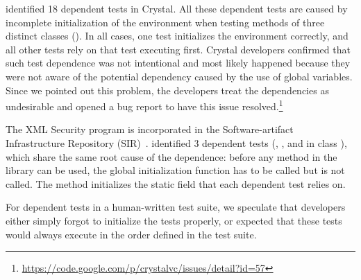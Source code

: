 \ourtool identified 18 dependent tests in Crystal.
All these dependent tests
are caused by incomplete initialization of the
environment when testing methods of three distinct classes
().
In all cases, one test initializes the environment correctly, and all
other tests rely on that test executing first. 
Crystal developers confirmed that such test dependence was not
intentional and most likely happened because they were not
aware of the potential dependency caused by the use of global
variables. Since we pointed out this problem, the developers treat the
dependencies as undesirable and opened a bug report to have this issue
resolved.\footnote{\url{https://code.google.com/p/crystalvc/issues/detail?id=57}}


%

The XML Security program is incorporated in the Soft\-ware-artifact
Infrastructure Repository (SIR)~\cite{sir}. \ourtool identified
3 dependent tests (, , and 
in class ), which share the same root
cause of the dependence: before any
method in the library can be used, the global initialization function 
 has to be called but is not called. The
 method initializes the static field that
each dependent test relies on.

For dependent tests in a human-written test suite, we speculate that
developers either simply forgot to
initialize the tests properly, or expected that these tests would always execute
in the order defined
in the test suite.




